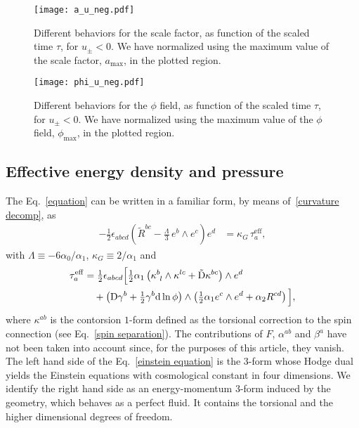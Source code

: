 \documentclass[aps,prd,12pt,superscriptaddress,showpacs,showkeys,reprint,nofootinbib]{revtex4-1}
\begin{document}
\begin{figure}[H]
  \texttt{[image: a\_u\_neg.pdf]}
  \caption{Different behaviors for the scale factor, as function of the scaled time $\tau$, for $u_\pm < 0$. We have normalized using the maximum value of the scale factor, $a_{\mathrm{max}}$, in the plotted region.}
  \label{a_u_neg}
\end{figure}

\begin{figure}[H]
  \texttt{[image: phi\_u\_neg.pdf]}
  \caption{Different behaviors for the $\phi$ field, as function of the scaled time $\tau$, for $u_\pm < 0$. We have normalized using the maximum value of the $\phi$ field, $\phi_{\mathrm{max}}$, in the plotted region.}
  \label{phi_u_neg}
\end{figure}


\subsection{Effective energy density and pressure}

The Eq.~\eqref{equation} can be written in a familiar form, by means of~\eqref{curvature decomp}, as
\begin{align}\label{einstein equation}
  -\frac{1}{2}\epsilon_{abcd}\left(\tilde{R}^{bc} - \frac{\Lambda}{3}\,e^b\wedge e^c\right)e^d &= \kappa_{G}\,\tau^{\mathrm{eff}}_a,
\end{align}
with $\Lambda \equiv -6\alpha_0/\alpha_1$, $\kappa_{G} \equiv 2/\alpha_1$ and 
\begin{align}
  \label{taua}
  \tau_a^{\mathrm{eff}}&= \tfrac{1}{2}\epsilon_{abcd}\Big[\tfrac{1}{2}\alpha_1\left(\kappa^b_{\ l}\wedge\kappa^{lc}+\tilde{\text{D}}\kappa^{bc}\right)\wedge e^d\\
    & \quad +\left(\text{D}\gamma^b+\tfrac{1}{2}\gamma^b\text{d}\ln\phi\right)\wedge\left(\tfrac{1}{2}\alpha_1e^c\wedge e^d+\alpha_2R^{cd}\right)\Big], \notag
\end{align}
where $\kappa^{ab}$ is the contorsion $1$-form defined as the torsional correction to the spin connection (see Eq.~\eqref{spin separation}).
The contributions of $F$, $\alpha^{ab}$ and $\beta^a$ have not been taken into account since, for the purposes of this article, they vanish. The left hand side of the Eq.~\eqref{einstein equation} is the $3$-form whose Hodge dual yields the Einstein equations with cosmological constant in four dimensions.
We identify the right hand side as an energy-momentum $3$-form induced by the geometry, which behaves as a perfect fluid. It contains the torsional and the higher dimensional degrees of freedom.
\end{document}
